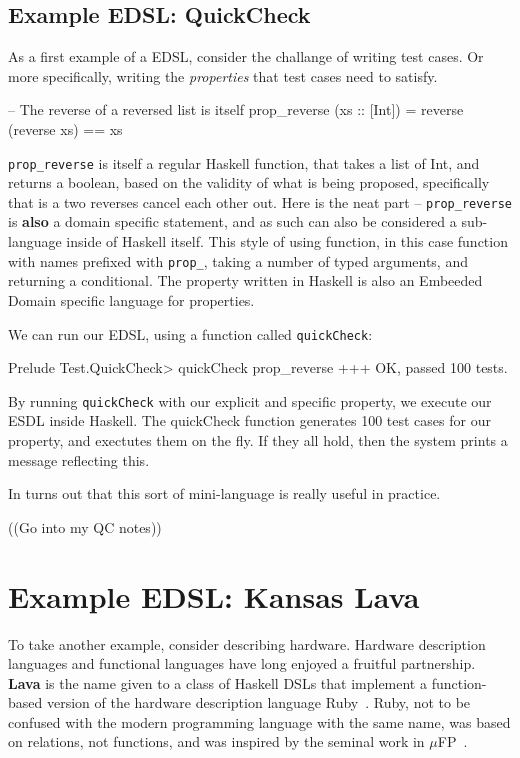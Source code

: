\documentclass[11pt]{article}
\begin{document}
\subsection{Example EDSL: QuickCheck}

As a first example of a EDSL, consider the challange of writing test cases.
Or more specifically, writing the {\em properties\/} that test cases need to satisfy.

\begin{Code}
-- The reverse of a reversed list is itself
prop_reverse (xs :: [Int]) = reverse (reverse xs) == xs
\end{Code}

\verb|prop_reverse| is itself a regular Haskell function,
that takes a list of Int, and returns a boolean, based
on the validity of what is being proposed, specifically
that is a two reverses cancel each other out. 
Here is the neat part -- \verb|prop_reverse| is {\bf also\/} a
domain specific statement, and as such can also be considered
a sub-language inside of Haskell itself.  This style
of using function, in this case function with names
prefixed with \verb|prop_|, taking a number of typed
arguments, and returning a conditional. The property
written in Haskell is also an Embeeded Domain specific
language for properties.

We can run our EDSL, using a function called \verb|quickCheck|:
\begin{Code}
Prelude Test.QuickCheck> quickCheck prop_reverse 
+++ OK, passed 100 tests.
\end{Code}
By running \verb|quickCheck| with our explicit and specific property,
we execute our ESDL inside Haskell. The quickCheck function
generates 100 test cases for our property, and exectutes
them on the fly. If they all hold, then the system prints
a message reflecting this.

In turns out that this sort of mini-language is really useful in practice.

((Go into my QC notes))

\section{Example EDSL: Kansas Lava}\label{sec:KansasLava}

To take another example, consider describing hardware.
Hardware description languages and functional languages have
long enjoyed a fruitful partnership.
{\bf Lava} is the name given to a class of Haskell DSLs
that implement a function-based version of the hardware description
language Ruby~\cite{Jones:90:Ruby,Hutton:93:RubyInterp}. Ruby, not to be confused with the
modern programming language with the same name, was based
on relations, not functions, and was inspired by
the seminal work in $\mu$FP~\cite{Sheeran:84:muFP}.
\end{document}
